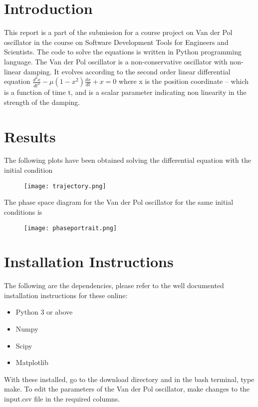 \documentclass{report}
\begin{document}
\section{Introduction}

This report is a part of the submission for a course project on Van der Pol oscillator in the course on Software Development Tools for Engineers and Scientists. The code to solve the equations is written in Python programming language.
The Van der Pol oscillator is a non-conservative oscillator with non-linear damping. It evolves according to the second order linear differential equation
$\frac{d^2x}{dt^2} - \mu(1 - x^2)\frac{dx}{dt} + x = 0$
where x is the position coordinate -- which is a function of time t, and \mu is a scalar parameter indicating non linearity in the strength of the damping.

\section{Results}

The following plots have been obtained solving the differential equation with the initial condition %
\begin{figure}
\texttt{[image: trajectory.png]}
\caption{} %
\label{trajectory}
\end{figure}
The phase space diagram for the Van der Pol oscillator for the same initial conditions is
\begin{figure}
\texttt{[image: phaseportrait.png]}
\caption{} %
\label{phaseportrait}
\end{figure}

\section{Installation Instructions}

The following are the dependencies, please refer to the well documented installation instructions for these online:
\begin{itemize}
	\item Python 3 or above
	\item Numpy
	\item Scipy
	\item Matplotlib
\end{itemize}

With these installed, go to the download directory and in the bash terminal, type make.
To edit the parameters of the Van der Pol oscillator, make changes to the input.csv file in the required columns.
\end{document}
